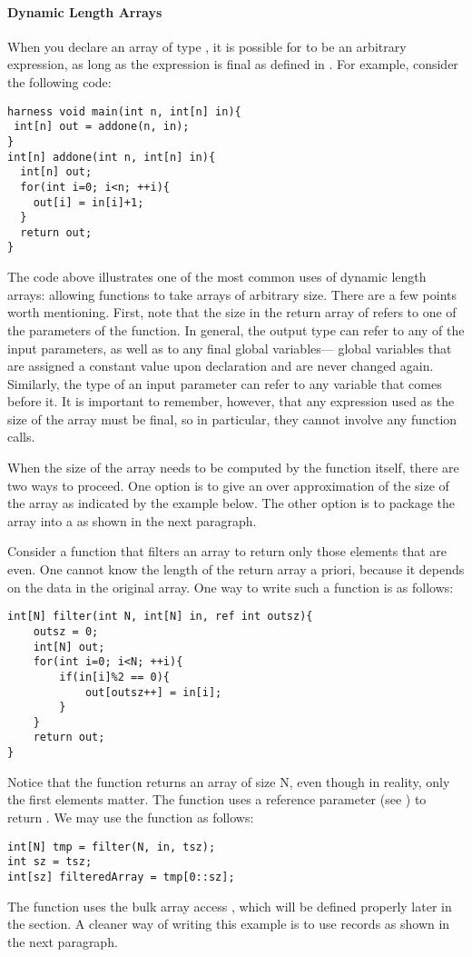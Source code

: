 \paragraph{Dynamic Length Arrays}

When you declare an array of type , it is possible for  to be an arbitrary expression, as long as the expression is final as defined in . For example, consider the following code:
\begin{lstlisting}
harness void main(int n, int[n] in){
 int[n] out = addone(n, in);
}
int[n] addone(int n, int[n] in){
  int[n] out;
  for(int i=0; i<n; ++i){
    out[i] = in[i]+1;
  }
  return out;
}
\end{lstlisting}

The code above illustrates one of the most common uses of dynamic length arrays: allowing functions to take arrays of arbitrary size. There are a few points worth mentioning. First, note that the size in the return array of  refers to one of the parameters of the function. In general, the output type can refer to any of the input parameters, as well as to any final global variables---\ie{} global variables that are assigned a constant value upon declaration and are never changed again. Similarly, the type of an input parameter can refer to any variable that comes before it. It is important to remember, however, that any expression used as the size of the array must be final, so in particular, they cannot involve any function calls.

When the size of the array needs to be computed by the function itself, there are two ways to proceed. One option is to give an over approximation of the size of the array as indicated by the example below. The other option is to package the array into a  as shown in the next paragraph.

\begin{Example}
Consider a function that filters an array to return only those elements that are even. One cannot know the length of the return array a priori, because it depends on the data in the original array. One way to write such a function is as follows:
\begin{lstlisting}
int[N] filter(int N, int[N] in, ref int outsz){
	outsz = 0;
	int[N] out;
	for(int i=0; i<N; ++i){
		if(in[i]%2 == 0){
			out[outsz++] = in[i];
		}
	}
	return out;
}
\end{lstlisting}
Notice that the function returns an array of size N, even though in reality, only the first  elements matter. The function uses a reference parameter (see ) to return .
We may use the function as follows:
\begin{lstlisting}
int[N] tmp = filter(N, in, tsz);
int sz = tsz;
int[sz] filteredArray = tmp[0::sz];
\end{lstlisting}
The function uses the bulk array access , which will be defined properly later in the section. A cleaner way of writing this example is to use records as shown in the next paragraph.
\end{Example}

